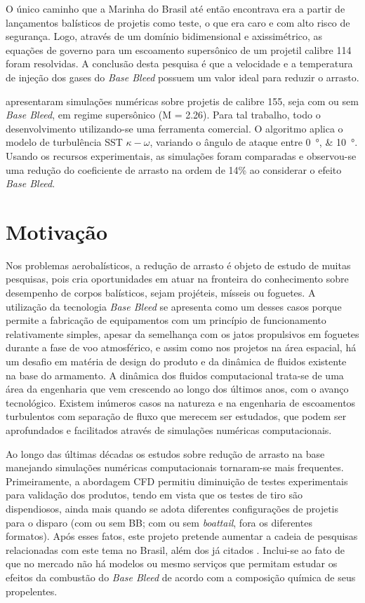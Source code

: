 O único caminho que a Marinha do Brasil até então encontrava era a partir de lançamentos balísticos de projetis como teste, o que era caro e com alto risco de segurança. Logo, através de um domínio bidimensional e axissimétrico, as equações de governo para um escoamento supersônico de um projetil calibre \qty{114}{\millimetre} foram resolvidas. A conclusão desta pesquisa é que a velocidade e a temperatura de injeção dos gases do \textit{Base Bleed} possuem um valor ideal para reduzir o arrasto.

\cite{Reddy2021} apresentaram simulações numéricas sobre projetis de calibre \qty{155}{\millimetre}, seja com ou sem \textit{Base Bleed}, em regime supersônico (M = \num{2,26}). Para tal trabalho, todo o desenvolvimento utilizando-se uma ferramenta comercial. O algoritmo aplica o modelo de turbulência SST \(\kappa-\omega\), variando o ângulo de ataque entre \qtylist{0;10}{\degree}. Usando os recursos experimentais, as simulações foram comparadas e observou-se uma redução do coeficiente de arrasto na ordem de 14\% ao considerar o efeito \textit{Base Bleed}. 

\section{Motivação}

Nos problemas aerobalísticos, a redução de arrasto é objeto de estudo de muitas pesquisas, pois cria oportunidades em atuar na fronteira do conhecimento sobre desempenho de corpos balísticos, sejam projéteis, mísseis ou foguetes. A utilização da tecnologia \textit{Base Bleed} se apresenta como um desses casos porque permite a fabricação de equipamentos com um princípio de funcionamento relativamente simples, apesar da semelhança com os jatos propulsivos em foguetes durante a fase de voo atmosférico, e assim como nos projetos na área espacial, há um desafio em matéria de design do produto e da dinâmica de fluidos existente na base do armamento. A dinâmica dos fluidos computacional trata-se de uma área da engenharia que vem crescendo ao longo dos últimos anos, com o avanço tecnológico. Existem inúmeros casos na natureza e na engenharia de escoamentos turbulentos com separação de fluxo que merecem ser estudados, que podem ser aprofundados e facilitados através de simulações numéricas computacionais.

Ao longo das últimas décadas os estudos sobre redução de arrasto na base manejando simulações numéricas computacionais tornaram-se mais frequentes. Primeiramente, a abordagem CFD permitiu diminuição de testes experimentais para validação dos produtos, tendo em vista que os testes de tiro são dispendiosos, ainda mais quando se adota diferentes configurações de projetis para o disparo (com ou sem BB; com ou sem \textit{boattail}, fora os diferentes formatos). Após esses fatos, este projeto pretende aumentar a cadeia de pesquisas relacionadas com este tema no Brasil, além dos já citados \cite{Lucena2020, Rosendo2020, Gil2020}. Inclui-se ao fato de que no mercado não há modelos ou mesmo serviços que permitam estudar os efeitos da combustão do \textit{Base Bleed} de acordo com a composição química de seus propelentes. 
	
